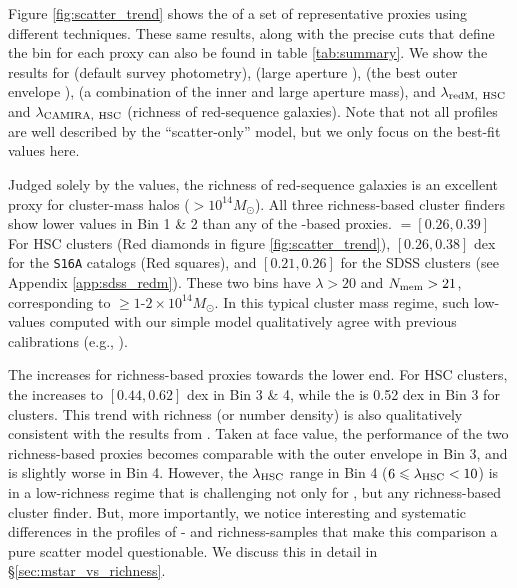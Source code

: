 \documentclass[fleqn,usenatbib,useAMS,english]{mnras}
\begin{document}
    Figure \ref{fig:scatter_trend} shows the \sigmvir{} of a set of representative \mvir{} proxies
    using different techniques. These same results, along with the precise cuts that define the
    bin for each proxy can also be found in table \ref{tab:summary}.
    We show the results for \mcmodel{} (default survey photometry),  (large aperture
    \mstar{}),  (the best outer envelope \mstar{}), \masap{} (a combination of the
    inner and large aperture mass), and $\lambda_{\rm redM,\ HSC}$ and $\lambda_{\rm CAMIRA,\
    HSC}$ (richness of red-sequence galaxies). Note that not all \dsigma{} profiles are well
    described by the ``scatter-only'' model, but we only focus on the best-fit \sigmvir{} values
    here.

    Judged solely by the \sigmvir{} values, the richness of red-sequence galaxies is an
    excellent \mvir{} proxy for cluster-mass halos ($>10^{14} M_{\odot}$).
    All three richness-based cluster finders show lower \sigmvir{} values in Bin 1 \& 2 than
    any of the \mstar{}-based \mvir{} proxies.
    \sigmvir{}$=[0.26, 0.39]$ For HSC \redm{} clusters (Red diamonds in figure
    \ref{fig:scatter_trend}), $[0.26, 0.38]$ dex for the \camira{} \texttt{S16A} catalogs (Red
    squares), and $[0.21, 0.26]$ for the SDSS \redm{} clusters (see Appendix
    \ref{app:sdss_redm}).
    These two bins have \redm{} $\lambda > 20$ and \camira{} $N_{\rm mem} > 21$,
    corresponding to \mvir{}$\geq 1$-$2\times 10^{14} M_{\odot}$.
    In this typical cluster mass regime, such low-\sigmvir{} values computed with our simple
    model qualitatively agree with previous calibrations (e.g., \citealt{Murata2018,
    Murata2019}).

    The \sigmvir{} increases for richness-based proxies towards the lower \mvir{} end.
    For HSC \redm{} clusters, the \sigmvir{} increases to $[0.44, 0.62]$ dex in Bin 3 \& 4,
    while the \sigmvir{} is 0.52 dex in Bin 3 for \camira{} clusters.
    This trend with richness (or number density) is also qualitatively consistent with
    the results from \citet{Murata2018, Murata2019}.
    Taken at face value, the performance of the two richness-based proxies becomes comparable
    with the outer envelope \mstar{} in Bin 3, and is slightly worse in Bin 4.
    However, the $\lambda_{\rm HSC}$ range in Bin 4 ($6 \leq \lambda_{\rm HSC} < 10$) is
    in a low-richness regime that is challenging not only for \redm{}, but any
    richness-based cluster finder.
    But, more importantly, we notice interesting and systematic differences in the \dsigma{}
    profiles of \mstar{}- and richness-samples that make this comparison a pure
    scatter model questionable.
    We discuss this in detail in \S \ref{sec:mstar_vs_richness}.
\end{document}
